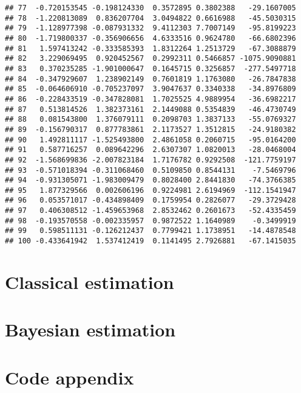 \documentclass[
]{article}
\begin{document}
\begin{verbatim}
## 77  -0.720153545 -0.198124330  0.3572895 0.3802388   -29.1607005
## 78  -1.220813089  0.836207704  3.0494822 0.6616988   -45.5030315
## 79  -1.128977398 -0.087931332  9.4112303 7.7007149   -95.8199223
## 80  -1.719800337 -0.356906656  4.6333516 0.9624780   -66.6802396
## 81   1.597413242 -0.333585393  1.8312264 1.2513729   -67.3088879
## 82   3.229069495  0.920452567  0.2992311 0.5466857 -1075.9090881
## 83   0.370235285 -1.901000647  0.1645715 0.3256857  -277.5497718
## 84  -0.347929607  1.238902149  0.7601819 1.1763080   -26.7847838
## 85  -0.064606910 -0.705237097  3.9047637 0.3340338   -34.8976809
## 86  -0.228433519 -0.347828081  1.7025525 4.9889954   -36.6982217
## 87   0.513814526  1.382373161  2.1449088 0.5354839   -46.4730749
## 88   0.081543800  1.376079111  0.2098703 1.3837133   -55.0769327
## 89  -0.156790317  0.877783861  2.1173527 1.3512815   -24.9180382
## 90   1.492811117 -1.525493800  2.4861058 0.2060715   -95.0164200
## 91   0.587716257  0.089642296  2.6307307 1.0820013   -28.0468004
## 92  -1.568699836 -2.007823184  1.7176782 0.9292508  -121.7759197
## 93  -0.571018394 -0.311068460  0.5109850 0.8544131    -7.5469796
## 94  -0.931305071 -1.983009479  0.8028400 2.8441830   -74.3766385
## 95   1.877329566  0.002606196  0.9224981 2.6194969  -112.1541947
## 96   0.053571017 -0.434898409  0.1759954 0.2826077   -29.3729428
## 97   0.406308512 -1.459653968  2.8532462 0.2601673   -52.4335459
## 98  -0.193570558 -0.002335957  0.9872522 1.1640989    -0.3499919
## 99   0.598511131 -0.126212437  0.7799421 1.1738951   -14.4878548
## 100 -0.433641942  1.537412419  0.1141495 2.7926881   -67.1415035
\end{verbatim}

\hypertarget{classical-estimation}{%
\section{Classical estimation}\label{classical-estimation}}

\hypertarget{bayesian-estimation}{%
\section{Bayesian estimation}\label{bayesian-estimation}}

\hypertarget{code-appendix}{%
\section{Code appendix}\label{code-appendix}}
\end{document}
